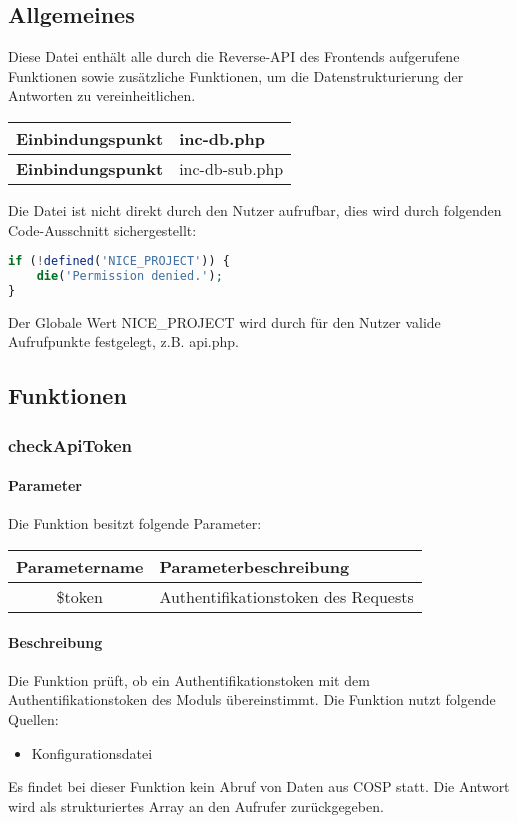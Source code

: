\subsection{Allgemeines} Diese Datei enthält alle durch die Reverse-API des Frontends aufgerufene Funktionen sowie zusätzliche Funktionen, um die Datenstrukturierung der Antworten zu vereinheitlichen.
\begin{table}[H]
	\begin{tabular}{|c|p{11cm}|}
		\hline
		\textbf{Einbindungspunkt} & inc-db.php \\ \hline
		\textbf{Einbindungspunkt} & inc-db-sub.php \\ \hline
	\end{tabular}
\end{table}
Die Datei ist nicht direkt durch den Nutzer aufrufbar, dies wird durch folgenden Code-Ausschnitt sichergestellt:
\begin{lstlisting}[language=php]
if (!defined('NICE_PROJECT')) {
	die('Permission denied.');
}
\end{lstlisting}
Der Globale Wert {\glqq NICE\_PROJECT\grqq} wird durch für den Nutzer valide Aufrufpunkte festgelegt, z.B. {\glqq api.php\grqq}.
\newpage
\subsection{Funktionen}
\subsubsection{checkApiToken}
\paragraph{Parameter} Die Funktion besitzt folgende Parameter:
\begin{table}[H]
	\begin{tabular}{|c|p{11cm}|}
		\hline
		\textbf{Parametername} & \textbf{Parameterbeschreibung} \\ \hline
		\$token & Authentifikationstoken des Requests \\ \hline
	\end{tabular}
\end{table}
\paragraph{Beschreibung} Die Funktion prüft, ob ein Authentifikationstoken mit dem Authentifikationstoken des Moduls übereinstimmt. Die Funktion nutzt folgende Quellen:
\begin{itemize}
	\item Konfigurationsdatei
\end{itemize}
Es findet bei dieser Funktion kein Abruf von Daten aus {\glqq COSP\grqq} statt. Die Antwort wird als strukturiertes Array an den Aufrufer zurückgegeben.
